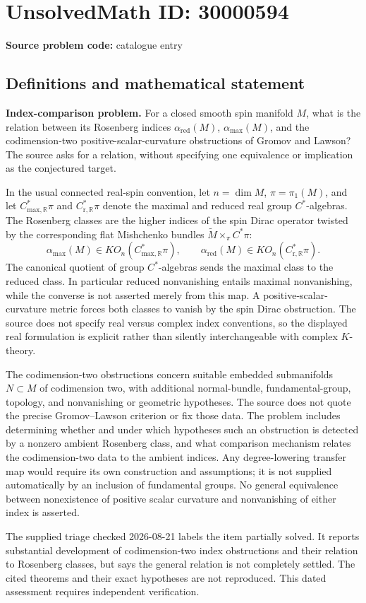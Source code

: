 \documentclass[11pt]{article}
\newcommand{\R}{\mathbb{R}}
\begin{document}
\section*{UnsolvedMath ID: 30000594}
\textbf{Source problem code:} catalogue entry
\subsection{Definitions and mathematical statement}
\textbf{Index-comparison problem.} For a closed smooth spin manifold \(M\), what is the relation between its Rosenberg indices \(\alpha_{\mathrm{red}}(M)\), \(\alpha_{\mathrm{max}}(M)\), and the codimension-two positive-scalar-curvature obstructions of Gromov and Lawson? The source asks for a relation, without specifying one equivalence or implication as the conjectured target.\par In the usual connected real-spin convention, let \(n=\dim M\), \(\pi=\pi_1(M)\), and let \(C^*_{\mathrm{max},\R}\pi\) and \(C^*_{\mathrm r,\R}\pi\) denote the maximal and reduced real group \(C^*\)-algebras. The Rosenberg classes are the higher indices of the spin Dirac operator twisted by the corresponding flat Mishchenko bundles \(\widetilde M\times_\pi C^*\pi\):\[\alpha_{\mathrm{max}}(M)\in KO_n(C^*_{\mathrm{max},\R}\pi),\qquad \alpha_{\mathrm{red}}(M)\in KO_n(C^*_{\mathrm r,\R}\pi).\] The canonical quotient of group \(C^*\)-algebras sends the maximal class to the reduced class. In particular reduced nonvanishing entails maximal nonvanishing, while the converse is not asserted merely from this map. A positive-scalar-curvature metric forces both classes to vanish by the spin Dirac obstruction. The source does not specify real versus complex index conventions, so the displayed real formulation is explicit rather than silently interchangeable with complex \(K\)-theory.\par The codimension-two obstructions concern suitable embedded submanifolds \(N\subset M\) of codimension two, with additional normal-bundle, fundamental-group, topology, and nonvanishing or geometric hypotheses. The source does not quote the precise Gromov--Lawson criterion or fix those data. The problem includes determining whether and under which hypotheses such an obstruction is detected by a nonzero ambient Rosenberg class, and what comparison mechanism relates the codimension-two data to the ambient indices. Any degree-lowering transfer map would require its own construction and assumptions; it is not supplied automatically by an inclusion of fundamental groups. No general equivalence between nonexistence of positive scalar curvature and nonvanishing of either index is asserted.\par The supplied triage checked 2026-08-21 labels the item partially solved. It reports substantial development of codimension-two index obstructions and their relation to Rosenberg classes, but says the general relation is not completely settled. The cited theorems and their exact hypotheses are not reproduced. This dated assessment requires independent verification.
\end{document}
